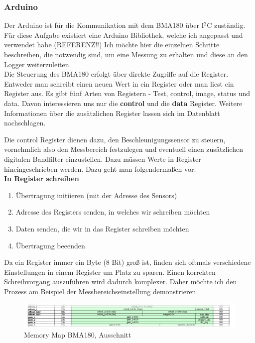 \documentclass[12pt,a4paper]{scrartcl}
\begin{document}
\subsubsection{Arduino}

Der Arduino ist für die Kommunikation mit dem BMA180 über I$^2$C zuständig. Für diese Aufgabe existiert eine Arduino Bibliothek, welche ich angepasst und verwendet habe (REFERENZ!!)
Ich möchte hier die einzelnen Schritte beschreiben, die notwendig sind, um eine Messung zu erhalten und diese an den Logger weiterzuleiten. \\

Die Steuerung des BMA180 erfolgt über direkte Zugriffe auf die Register. Entweder man schreibt einen neuen Wert in ein Register oder man liest ein Register aus. Es gibt fünf Arten von Registern - Test, control, image, status und data.
Davon interessieren uns nur die \textbf{control} und die \textbf{data} Register. Weitere Informationen über die zusätzlichen Register lassen sich im Datenblatt \citep{Sensortec:2009rt} nachschlagen.

Die control Register dienen dazu, den Beschleunigungssensor zu steuern, vornehmlich also den Messbereich festzulegen und eventuell einen zusätzlichen digitalen Bandfilter einzustellen. Dazu müssen Werte in Register hineingeschrieben werden. Dazu geht man folgendermaßen vor:\\

\textbf{In Register schreiben}
\begin{enumerate}
	\item Übertragung initiieren (mit der Adresse des Sensors)
	\item Adresse des Registers senden, in welches wir schreiben möchten
	\item Daten senden, die wir in das Register schreiben möchten
	\item Übertragung beeenden
\end{enumerate}

Da ein Register immer ein Byte (8 Bit) groß ist, finden sich oftmals verschiedene Einstellungen in einem Register um Platz zu sparen. Einen korrekten Schreibvorgang auszuführen wird dadurch komplexer. Daher möchte ich den Prozess am Beispiel der Messbereichseinstellung demonstrieren.

\begin{figure}[H]
\includegraphics[scale=.359]{registerstransp}
\caption{Memory Map BMA180, Ausschnitt \citep{Sensortec:2009rt}}
\label{registermap}
\end{figure}
\end{document}
